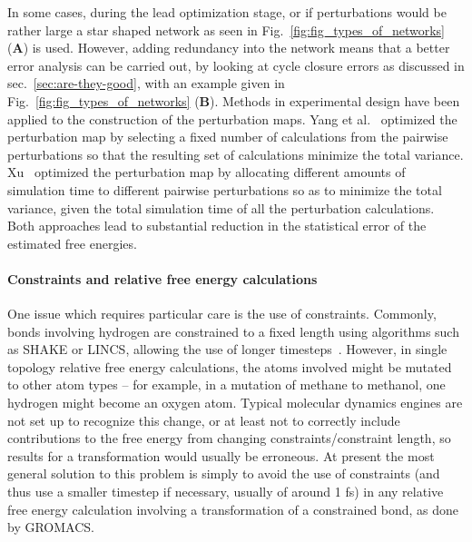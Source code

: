\documentclass[9pt,bestpractices]{livecoms}
\begin{document}
In some cases, during the lead optimization stage, or if perturbations would be rather large a star shaped network as seen in Fig.~\ref{fig:fig_types_of_networks} (\textbf{A}) is used. However, adding redundancy into the network means that a better error analysis can be carried out, by looking at cycle closure errors as discussed in sec.~\ref{sec:are-they-good}, with an example given in Fig.~\ref{fig:fig_types_of_networks} (\textbf{B}).
%
Methods in experimental design have been applied to the construction of the perturbation maps. Yang et al.~\cite{yang2020optimal} optimized the perturbation map by selecting a fixed number of calculations from the pairwise perturbations so that the resulting set of calculations minimize the total variance. Xu~\cite{xu2019optimal} optimized the perturbation map by allocating different amounts of simulation time to different pairwise perturbations so as to minimize the total variance, given the total simulation time of all the perturbation calculations. Both approaches lead to substantial reduction in the statistical error of the estimated free energies.  
%
\paragraph{Constraints and relative free energy calculations}
One issue which requires particular care is the use of constraints.
Commonly, bonds involving hydrogen are constrained to a fixed length using algorithms such as SHAKE or LINCS, allowing the use of longer timesteps~\cite{krautler2001fast}.
However, in single topology relative free energy calculations, the atoms involved might be mutated to other atom types -- for example, in a mutation of methane to methanol, one hydrogen might become an oxygen atom.
Typical molecular dynamics engines are not set up to recognize this change, or at least not to correctly include contributions to the free energy from changing constraints/constraint length, so results for a transformation would usually be erroneous.
At present the most general solution to this problem is simply to avoid the use of constraints (and thus use a smaller timestep if necessary, usually of around 1 fs) in any relative free energy calculation involving a transformation of a constrained bond, as done by GROMACS. 
%
\end{document}
